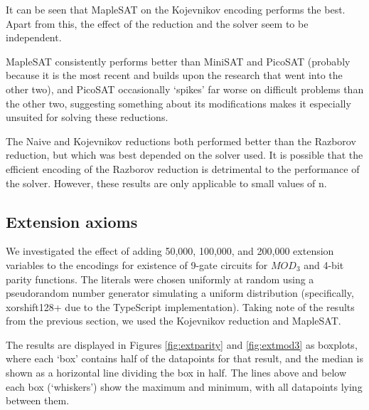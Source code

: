 \documentclass{article}
\begin{document}
It can be seen that MapleSAT on the Kojevnikov encoding performs the best. Apart from this, the effect of the reduction and the solver seem to be independent.

MapleSAT consistently performs better than MiniSAT and PicoSAT (probably because it is the most recent and builds upon the research that went into the other two), and PicoSAT occasionally `spikes' far worse on difficult problems than the other two, suggesting something about its modifications makes it especially unsuited for solving these reductions.

The Naive and Kojevnikov reductions both performed better than the Razborov reduction, but which was best depended on the solver used. It is possible that the efficient encoding of the Razborov reduction is detrimental to the performance of the solver. However, these results are only applicable to small values of n.

\clearpage 

\subsection{Extension axioms}

We investigated the effect of adding 50,000, 100,000, and 200,000 extension variables to the encodings for existence of 9-gate circuits for \(MOD_3\) and 4-bit parity functions. The literals were chosen uniformly at random using a pseudorandom number generator simulating a uniform distribution (specifically, xorshift128+ due to the TypeScript implementation). Taking note of the results from the previous section, we used the Kojevnikov reduction and MapleSAT.

The results are displayed in Figures \ref{fig:extparity} and \ref{fig:extmod3} as boxplots, where each `box' contains half of the datapoints for that result, and the median is shown as a horizontal line dividing the box in half. The lines above and below each box (`whiskers') show the maximum and minimum, with all datapoints lying between them.
\end{document}
